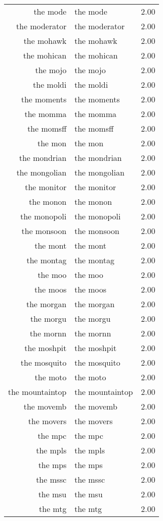 \begin{table}[ht]
\begin{tabular}{rlr}
  the mode & the mode & 2.00 \\ 
  the moderator & the moderator & 2.00 \\ 
  the mohawk & the mohawk & 2.00 \\ 
  the mohican & the mohican & 2.00 \\ 
  the mojo & the mojo & 2.00 \\ 
  the moldi & the moldi & 2.00 \\ 
  the moments & the moments & 2.00 \\ 
  the momma & the momma & 2.00 \\ 
  the momsff & the momsff & 2.00 \\ 
  the mon & the mon & 2.00 \\ 
  the mondrian & the mondrian & 2.00 \\ 
  the mongolian & the mongolian & 2.00 \\ 
  the monitor & the monitor & 2.00 \\ 
  the monon & the monon & 2.00 \\ 
  the monopoli & the monopoli & 2.00 \\ 
  the monsoon & the monsoon & 2.00 \\ 
  the mont & the mont & 2.00 \\ 
  the montag & the montag & 2.00 \\ 
  the moo & the moo & 2.00 \\ 
  the moos & the moos & 2.00 \\ 
  the morgan & the morgan & 2.00 \\ 
  the morgu & the morgu & 2.00 \\ 
  the mornn & the mornn & 2.00 \\ 
  the moshpit & the moshpit & 2.00 \\ 
  the mosquito & the mosquito & 2.00 \\ 
  the moto & the moto & 2.00 \\ 
  the mountaintop & the mountaintop & 2.00 \\ 
  the movemb & the movemb & 2.00 \\ 
  the movers & the movers & 2.00 \\ 
  the mpc & the mpc & 2.00 \\ 
  the mpls & the mpls & 2.00 \\ 
  the mps & the mps & 2.00 \\ 
  the mssc & the mssc & 2.00 \\ 
  the msu & the msu & 2.00 \\ 
  the mtg & the mtg & 2.00 \\ 

\end{tabular}
\end{table}
